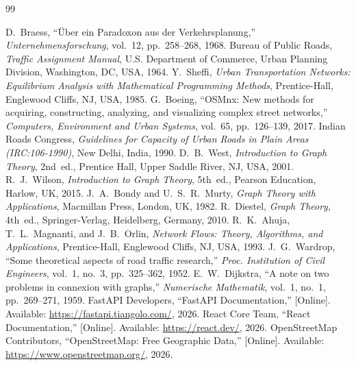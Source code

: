 \documentclass[12pt,a4paper]{report}
\begin{document}
\begin{thebibliography}{99}

 D.~Braess, ``Über ein Paradoxon aus der Verkehrsplanung,'' \textit{Unternehmensforschung}, vol.~12, pp.~258--268, 1968.
 Bureau of Public Roads, \textit{Traffic Assignment Manual}, U.S. Department of Commerce, Urban Planning Division, Washington, DC, USA, 1964.
 Y.~Sheffi, \textit{Urban Transportation Networks: Equilibrium Analysis with Mathematical Programming Methods}, Prentice-Hall, Englewood Cliffs, NJ, USA, 1985.
 G.~Boeing, ``OSMnx: New methods for acquiring, constructing, analyzing, and visualizing complex street networks,'' \textit{Computers, Environment and Urban Systems}, vol.~65, pp.~126--139, 2017.
 Indian Roads Congress, \textit{Guidelines for Capacity of Urban Roads in Plain Areas (IRC:106-1990)}, New Delhi, India, 1990.
 D.~B.~West, \textit{Introduction to Graph Theory}, 2nd~ed., Prentice Hall, Upper Saddle River, NJ, USA, 2001.
 R.~J.~Wilson, \textit{Introduction to Graph Theory}, 5th~ed., Pearson Education, Harlow, UK, 2015.
 J.~A.~Bondy and U.~S.~R.~Murty, \textit{Graph Theory with Applications}, Macmillan Press, London, UK, 1982.
 R.~Diestel, \textit{Graph Theory}, 4th~ed., Springer-Verlag, Heidelberg, Germany, 2010.
 R.~K.~Ahuja, T.~L.~Magnanti, and J.~B.~Orlin, \textit{Network Flows: Theory, Algorithms, and Applications}, Prentice-Hall, Englewood Cliffs, NJ, USA, 1993.
 J.~G.~Wardrop, ``Some theoretical aspects of road traffic research,'' \textit{Proc. Institution of Civil Engineers}, vol.~1, no.~3, pp.~325--362, 1952.
 E.~W.~Dijkstra, ``A note on two problems in connexion with graphs,'' \textit{Numerische Mathematik}, vol.~1, no.~1, pp.~269--271, 1959.
 FastAPI Developers, ``FastAPI Documentation,'' [Online]. Available: \url{https://fastapi.tiangolo.com/}, 2026.
 React Core Team, ``React Documentation,'' [Online]. Available: \url{https://react.dev/}, 2026.
 OpenStreetMap Contributors, ``OpenStreetMap: Free Geographic Data,'' [Online]. Available: \url{https://www.openstreetmap.org/}, 2026.

\end{thebibliography}
\end{document}
